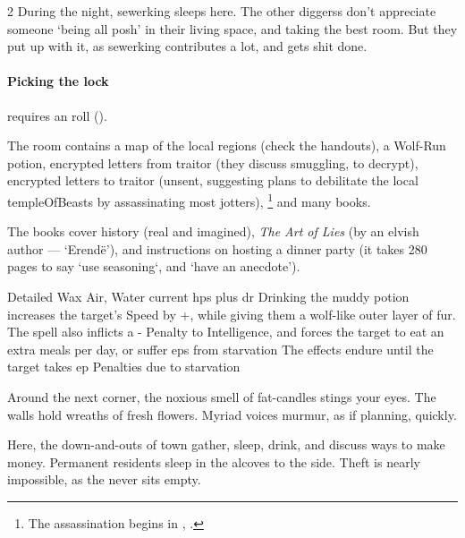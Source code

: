 \begin{multicols}{2}
During the night, \gls{sewerking} sleeps here.
The other \glspl{diggers} don't appreciate someone `being all posh' in their living space, and taking the best room.
But they put up with it, as \gls{sewerking} contributes a lot, and gets shit done.

\paragraph{Picking the lock}
requires an  roll (\tn[9]).

The room contains a map of the local \glspl{region} (check the handouts), a Wolf-Run potion, encrypted letters%
from \gls{traitor} (they discuss smuggling, \tn[13] to decrypt), encrypted letters to \gls{traitor} (unsent, suggesting plans to debilitate the local \gls{templeOfBeasts} by assassinating most \glspl{jotter}),%
\footnote{The assassination begins in , .}
and many books.

The books cover history (real and imagined), \textit{The Art of Lies} (by an elvish author --- `Erend\"e'), and instructions on hosting a dinner party (it takes 280 pages to say `use seasoning`, and `have an anecdote').


  {Detailed}%
  {Wax}%
  {Air, Water}%
  {current \glspl{hp} plus \gls{dr}}%
  {Drinking the muddy potion increases the target's Speed by +, while giving them a wolf-like outer layer of fur.
  The spell also inflicts a - Penalty to Intelligence, and forces the target to eat an extra  meals per day, or suffer \glspl{ep} from starvation}%
  {The effects endure until the target takes \gls{ep} Penalties due to starvation}%

\showTalisman



\begin{boxtext}
  Around the next corner, the noxious smell of fat-candles stings your eyes.
  The walls hold wreaths of fresh flowers.
  Myriad voices murmur, as if planning, quickly.
\end{boxtext}

Here, the down-and-outs of \gls{town} gather, sleep, drink, and discuss ways to make money.
Permanent residents sleep in the alcoves to the side.
Theft is nearly impossible, as the  never sits empty.


\end{multicols}
